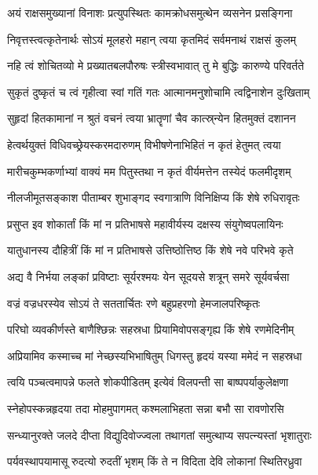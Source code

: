 \twolineshloka
{अयं राक्षसमुख्यानां विनाशः प्रत्युपस्थितः}
{कामक्रोधसमुत्थेन व्यसनेन प्रसङ्गिना} %

\twolineshloka
{निवृत्तस्त्वत्कृतेनार्थः सोऽयं मूलहरो महान्}
{त्वया कृतमिदं सर्वमनाथं राक्षसं कुलम्} %

\twolineshloka
{नहि त्वं शोचितव्यो मे प्रख्यातबलपौरुषः}
{स्त्रीस्वभावात् तु मे बुद्धिः कारुण्ये परिवर्तते} %

\twolineshloka
{सुकृतं दुष्कृतं च त्वं गृहीत्वा स्वां गतिं गतः}
{आत्मानमनुशोचामि त्वद्विनाशेन दुःखिताम्} %

\twolineshloka
{सुहृदां हितकामानां न श्रुतं वचनं त्वया}
{भ्रातॄणां चैव कात्स्र्न्येन हितमुक्तं दशानन} %

\twolineshloka
{हेत्वर्थयुक्तं विधिवच्छ्रेयस्करमदारुणम्}
{विभीषणेनाभिहितं न कृतं हेतुमत् त्वया} %

\twolineshloka
{मारीचकुम्भकर्णाभ्यां वाक्यं मम पितुस्तथा}
{न कृतं वीर्यमत्तेन तस्येदं फलमीदृशम्} %

\twolineshloka
{नीलजीमूतसङ्काश पीताम्बर शुभाङ्गद}
{स्वगात्राणि विनिक्षिप्य किं शेषे रुधिरावृतः} %

\twolineshloka
{प्रसुप्त इव शोकार्तां किं मां न प्रतिभाषसे}
{महावीर्यस्य दक्षस्य संयुगेष्वपलायिनः} %

\twolineshloka
{यातुधानस्य दौहित्रीं किं मां न प्रतिभाषसे}
{उत्तिष्ठोत्तिष्ठ किं शेषे नवे परिभवे कृते} %

\twolineshloka
{अद्य वै निर्भया लङ्कां प्रविष्टाः सूर्यरश्मयः}
{येन सूदयसे शत्रून् समरे सूर्यवर्चसा} %

\twolineshloka
{वज्रं वज्रधरस्येव सोऽयं ते सततार्चितः}
{रणे बहुप्रहरणो हेमजालपरिष्कृतः} %

\twolineshloka
{परिघो व्यवकीर्णस्ते बाणैश्छिन्नः सहस्रधा}
{प्रियामिवोपसङ्गृह्य किं शेषे रणमेदिनीम्} %

\twolineshloka
{अप्रियामिव कस्माच्च मां नेच्छस्यभिभाषितुम्}
{धिगस्तु हृदयं यस्या ममेदं न सहस्रधा} %

\twolineshloka
{त्वयि पञ्चत्वमापन्ने फलते शोकपीडितम्}
{इत्येवं विलपन्ती सा बाष्पपर्याकुलेक्षणा} %

\twolineshloka
{स्नेहोपस्कन्नहृदया तदा मोहमुपागमत्}
{कश्मलाभिहता सन्ना बभौ सा रावणोरसि} %

\twolineshloka
{सन्ध्यानुरक्ते जलदे दीप्ता विद्युदिवोज्ज्वला}
{तथागतां समुत्थाप्य सपत्न्यस्तां भृशातुराः} %

\twolineshloka
{पर्यवस्थापयामासू रुदत्यो रुदतीं भृशम्}
{किं ते न विदिता देवि लोकानां स्थितिरध्रुवा} %

